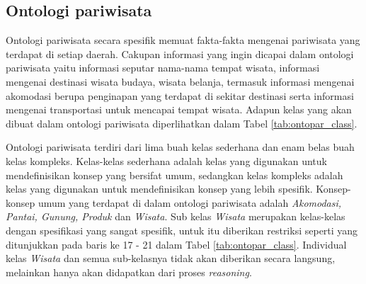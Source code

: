 \subsection{Ontologi pariwisata}
Ontologi pariwisata secara spesifik memuat fakta-fakta mengenai pariwisata yang terdapat di setiap daerah. Cakupan informasi yang ingin dicapai dalam ontologi pariwisata yaitu informasi seputar nama-nama tempat wisata, informasi mengenai destinasi wisata budaya, wisata belanja, termasuk informasi mengenai akomodasi berupa penginapan yang terdapat di sekitar destinasi serta informasi mengenai transportasi untuk mencapai tempat wisata. Adapun kelas yang akan dibuat dalam ontologi pariwisata diperlihatkan dalam Tabel \ref{tab:ontopar_class}.

Ontologi pariwisata terdiri dari lima buah kelas sederhana dan enam belas buah kelas kompleks. Kelas-kelas sederhana adalah kelas yang digunakan untuk mendefinisikan konsep yang bersifat umum, sedangkan kelas kompleks adalah kelas yang digunakan untuk mendefinisikan konsep yang lebih spesifik. Konsep-konsep umum yang terdapat di dalam ontologi pariwisata adalah \emph{Akomodasi, Pantai, Gunung, Produk} dan \emph{Wisata}. Sub kelas \emph{Wisata} merupakan kelas-kelas dengan spesifikasi yang sangat spesifik, untuk itu diberikan restriksi seperti yang ditunjukkan pada baris ke 17 - 21 dalam Tabel \ref{tab:ontopar_class}. Individual kelas \emph{Wisata} dan semua sub-kelasnya tidak akan diberikan secara langsung, melainkan hanya akan didapatkan dari proses \emph{reasoning}.

